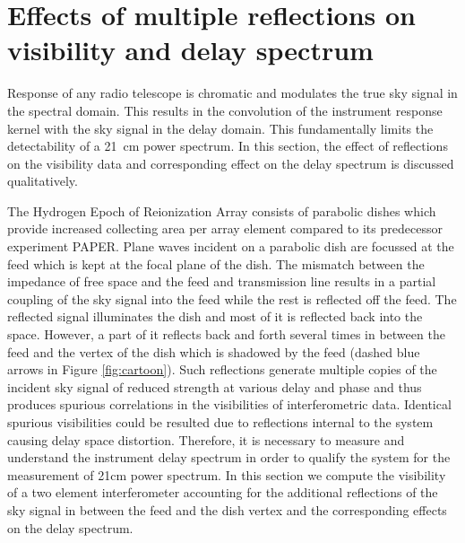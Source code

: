 \documentclass[iop]{emulateapj}
\begin{document}


\section{Effects of multiple reflections on visibility and delay spectrum}
Response of any radio telescope is chromatic and modulates the true sky signal in the spectral domain. This results in the convolution of the instrument response kernel with the sky signal in the delay domain.
This fundamentally limits the detectability of a 21~cm power spectrum. In this section, the effect of reflections on the visibility data and corresponding effect on the delay spectrum is discussed qualitatively.
 
The Hydrogen Epoch of Reionization Array consists of parabolic dishes which provide increased collecting area per array element compared to its predecessor experiment PAPER. Plane waves incident on a parabolic dish are focussed at the feed which is kept at the focal plane of the dish.
The mismatch between the impedance of free space and the feed and transmission line results in a partial coupling of the sky signal into the feed while the rest is reflected off the feed. 
The reflected signal illuminates the dish and most of it is reflected back into the space.
However, a part of it reflects back and forth several times in between the feed and the vertex of the dish which is shadowed by the feed (dashed blue arrows in Figure \ref{fig:cartoon}).
Such reflections generate multiple copies of the incident sky signal of reduced strength at various delay and phase and thus produces spurious correlations in the visibilities of interferometric data.  Identical spurious visibilities could be resulted due to reflections internal to the system causing delay space distortion. Therefore, it is necessary to measure and understand the instrument delay spectrum in order to qualify the system for the measurement of 21cm power spectrum. 
In this section we compute the visibility of a two element interferometer accounting for the additional reflections of the sky signal in between the feed and the dish vertex and the corresponding effects on the delay spectrum. 
\end{document}
